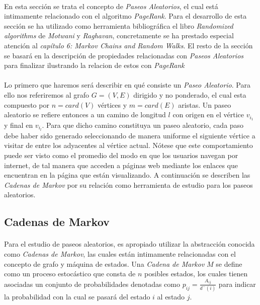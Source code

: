 \documentclass{subfiles}
\begin{document}
      \paragraph{}
      En esta sección se trata el concepto de \emph{Paseos Aleatorios}, el cual está intimamente relacionado con el algoritmo \emph{PageRank}. Para el desarrollo de esta sección se ha utilizado como herramienta bibliográfica el libro \emph{Randomized algorithms} \cite{motwani2010randomized} de \emph{Motwani} y \emph{Raghavan}, concretamente se ha prestado especial atención al \emph{capítulo 6: Markov Chains and Random Walks}. El resto de la sección se basará en la descripción de propiedades relacionadas con \emph{Paseos Aleatorios} para finalizar ilustrando la relacion de estos con \emph{PageRank}

      \paragraph{}
      Lo primero que haremos será describir en qué consiste un \emph{Paseo Aleatorio}. Para ello nos referiremos al grafo $G=(V,E)$ dirigido y no ponderado, el cual esta compuesto por $n = card(V)$ vértices y $m=card(E)$ aristas. Un paseo aleatorio se refiere entonces a un camino de longitud $l$ con origen en el vértice $v_{i_1}$ y final en $v_{i_l}$. Para que dicho camino constituya un paseo aleatorio, cada paso debe haber sido generado seleccionando de manera uniforme el siguiente vértice a visitar de entre los adyacentes al vértice actual. Nótese que este comportamiento puede ser visto como el promedio del modo en que los usuarios navegan por internet, de tal manera que acceden a páginas web mediante los enlaces que encuentran en la página que están visualizando. A continuación se describen las \emph{Cadenas de Markov} por su relación como herramienta de estudio para los paseos aleatorios.


      \subsection{Cadenas de Markov}
      \label{sec:markov_chains}

        \paragraph{}
        Para el estudio de paseos aleatorios, es apropiado utilizar la abstracción conocida como \emph{Cadenas de Markov}, las cuales están intimamente relacionadas con el concepto de grafo y máquina de estados. Una \emph{Cadena de Markov} $M$ se define como un proceso estocástico que consta de $n$ posibles estados, los cuales tienen asociadas un conjunto de probabilidades denotadas como $p_{ij}=\frac{A_{ij}}{d^-(i)}$ para indicar la probabilidad con la cual se pasará del estado $i$ al estado $j$.
\end{document}
